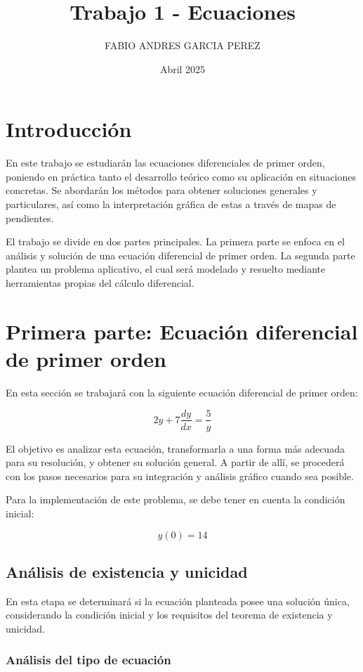 \documentclass{article}
\title{Trabajo 1 - Ecuaciones}
\author{FABIO ANDRES GARCIA PEREZ}
\date{Abril 2025}
\begin{document}
\maketitle

\section*{Introducción}

En este trabajo se estudiarán las ecuaciones diferenciales de primer orden, poniendo en práctica tanto el desarrollo teórico como su aplicación en situaciones concretas. Se abordarán los métodos para obtener soluciones generales y particulares, así como la interpretación gráfica de estas a través de mapas de pendientes.

El trabajo se divide en dos partes principales. La primera parte se enfoca en el análisis y solución de una ecuación diferencial de primer orden. La segunda parte plantea un problema aplicativo, el cual será modelado y resuelto mediante herramientas propias del cálculo diferencial.

\section{Primera parte: Ecuación diferencial de primer orden}

En esta sección se trabajará con la siguiente ecuación diferencial de primer orden:

\[
2y + 7\frac{dy}{dx} = \frac{5}{y}
\]

El objetivo es analizar esta ecuación, transformarla a una forma más adecuada para su resolución, y obtener su solución general. A partir de allí, se procederá con los pasos necesarios para su integración y análisis gráfico cuando sea posible.

Para la implementación de este problema, se debe tener en cuenta la condición inicial:

\[
y(0)= 14
\]

\subsection{Análisis de existencia y unicidad}

En esta etapa se determinará si la ecuación planteada posee una solución única, considerando la condición inicial y los requisitos del teorema de existencia y unicidad.

\subsubsection*{Análisis del tipo de ecuación}
\end{document}
